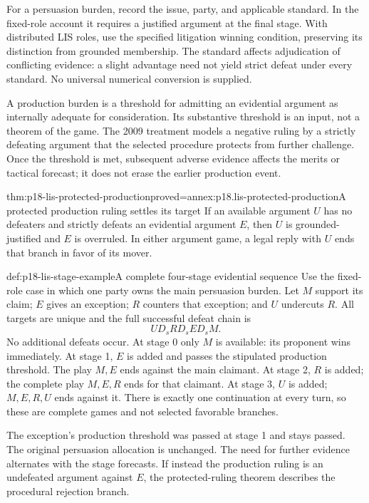 For a persuasion burden, record the issue, party, and applicable
standard. In the fixed-role account it requires a justified
argument at the final stage. With distributed LIS roles, use the
specified litigation winning condition, preserving its distinction
from grounded membership.
The standard affects adjudication of conflicting evidence:
a slight advantage need not yield strict defeat under every
standard. No universal numerical conversion is supplied.

A production burden is a threshold for admitting an evidential
argument as internally adequate for consideration.
Its substantive threshold is an input, not a theorem of the game.
The 2009 treatment models a negative ruling by a strictly defeating
argument that the selected procedure protects from further challenge.
Once the threshold is met, subsequent adverse evidence affects
the merits or tactical forecast; it does not erase the earlier
production event.

\begin{hbtheorem}{thm:p18-lis-protected-production}{proved=annex:p18.lis-protected-production}{A protected production ruling settles its target}
If an available argument \(U\) has no defeaters and strictly defeats
an evidential argument \(E\), then \(U\) is grounded-justified and
\(E\) is overruled. In either argument game, a legal reply with \(U\)
ends that branch in favor of its mover.
\end{hbtheorem}

\begin{hbexample}{def:p18-lis-stage-example}{A complete four-stage evidential sequence}
Use the fixed-role case in which one party owns the main persuasion
burden. Let \(M\) support its claim; \(E\) gives an exception;
\(R\) counters that exception; and \(U\) undercuts \(R\).
All targets are unique and the full successful defeat chain is
\[
U D_s R D_s E D_s M .
\]
No additional defeats occur. At stage 0 only \(M\) is available:
its proponent wins immediately.
At stage 1, \(E\) is added and passes the stipulated production
threshold. The play \(M,E\) ends against the main claimant.
At stage 2, \(R\) is added; the complete play \(M,E,R\) ends
for that claimant.
At stage 3, \(U\) is added; \(M,E,R,U\) ends against it.
There is exactly one continuation at every turn, so these are
complete games and not selected favorable branches.

The exception's production threshold was passed at stage 1
and stays passed. The original persuasion allocation is unchanged.
The need for further evidence alternates with the stage forecasts.
If instead the production ruling is an undefeated argument
against \(E\), the protected-ruling theorem describes the
procedural rejection branch.
\end{hbexample}


